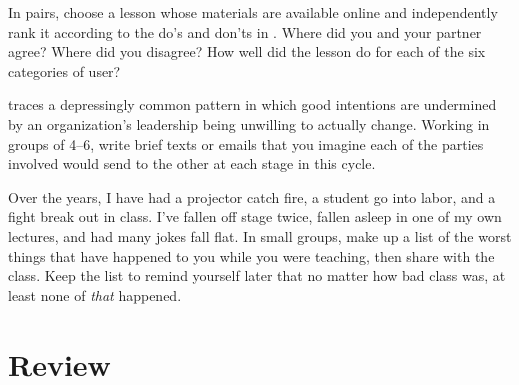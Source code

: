 
In pairs,
choose a lesson whose materials are available online
and independently rank it according to the do's and don'ts in
.
Where did you and your partner agree?
Where did you disagree?
How well did the lesson do for each of the six categories of user?


\cite{Coco2018} traces a depressingly common pattern
in which good intentions are undermined by
an organization's leadership being unwilling to actually change.
Working in groups of 4--6,
write brief texts or emails that you imagine each of the parties involved would send to the other
at each stage in this cycle.


Over the years,
I have had a projector catch fire,
a student go into labor,
and a fight break out in class.
I've fallen off stage twice,
fallen asleep in one of my own lectures,
and had many jokes fall flat.
In small groups,
make up a list of the worst things that have happened to you while you were teaching,
then share with the class.
Keep the list to remind yourself later that no matter how bad class was,
at least none of \emph{that} happened.

\section*{Review}

